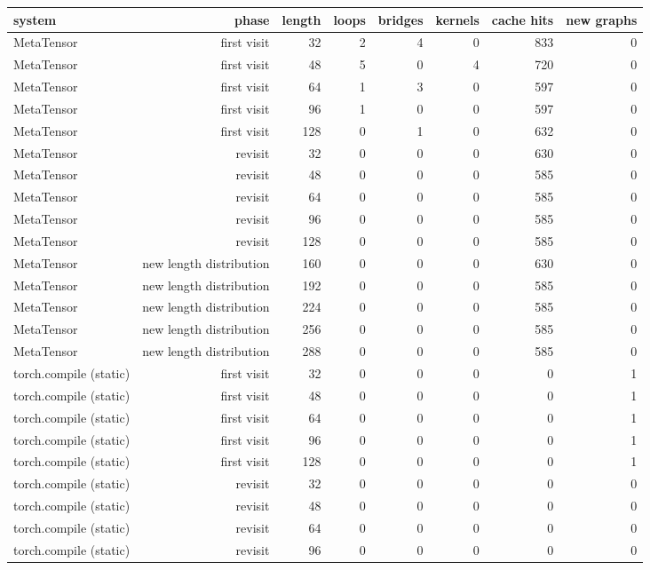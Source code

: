 \begin{tabular}{lrrrrrrr}
\toprule
system & phase & length & loops & bridges & kernels & cache hits & new graphs \\
\midrule
MetaTensor & first visit & 32 & 2 & 4 & 0 & 833 & 0 \\
MetaTensor & first visit & 48 & 5 & 0 & 4 & 720 & 0 \\
MetaTensor & first visit & 64 & 1 & 3 & 0 & 597 & 0 \\
MetaTensor & first visit & 96 & 1 & 0 & 0 & 597 & 0 \\
MetaTensor & first visit & 128 & 0 & 1 & 0 & 632 & 0 \\
MetaTensor & revisit & 32 & 0 & 0 & 0 & 630 & 0 \\
MetaTensor & revisit & 48 & 0 & 0 & 0 & 585 & 0 \\
MetaTensor & revisit & 64 & 0 & 0 & 0 & 585 & 0 \\
MetaTensor & revisit & 96 & 0 & 0 & 0 & 585 & 0 \\
MetaTensor & revisit & 128 & 0 & 0 & 0 & 585 & 0 \\
MetaTensor & new length distribution & 160 & 0 & 0 & 0 & 630 & 0 \\
MetaTensor & new length distribution & 192 & 0 & 0 & 0 & 585 & 0 \\
MetaTensor & new length distribution & 224 & 0 & 0 & 0 & 585 & 0 \\
MetaTensor & new length distribution & 256 & 0 & 0 & 0 & 585 & 0 \\
MetaTensor & new length distribution & 288 & 0 & 0 & 0 & 585 & 0 \\
torch.compile (static) & first visit & 32 & 0 & 0 & 0 & 0 & 1 \\
torch.compile (static) & first visit & 48 & 0 & 0 & 0 & 0 & 1 \\
torch.compile (static) & first visit & 64 & 0 & 0 & 0 & 0 & 1 \\
torch.compile (static) & first visit & 96 & 0 & 0 & 0 & 0 & 1 \\
torch.compile (static) & first visit & 128 & 0 & 0 & 0 & 0 & 1 \\
torch.compile (static) & revisit & 32 & 0 & 0 & 0 & 0 & 0 \\
torch.compile (static) & revisit & 48 & 0 & 0 & 0 & 0 & 0 \\
torch.compile (static) & revisit & 64 & 0 & 0 & 0 & 0 & 0 \\
torch.compile (static) & revisit & 96 & 0 & 0 & 0 & 0 & 0 \\

\end{tabular}
